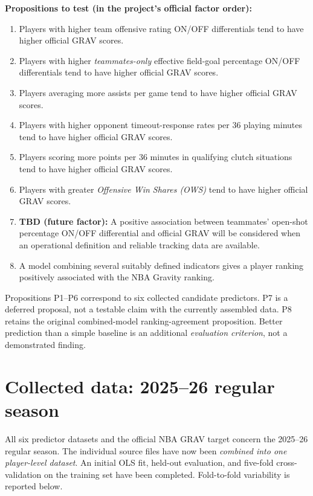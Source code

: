 \documentclass[11pt]{article}
\begin{document}
\textbf{Propositions to test (in the project's official factor order):}
\begin{enumerate}[label=\textbf{P\arabic*:}]
\item Players with higher team offensive rating ON/OFF differentials tend to
have higher official GRAV scores.
\item Players with higher \emph{teammates-only} effective field-goal percentage
ON/OFF differentials tend to have higher official GRAV scores.
\item Players averaging more assists per game tend to have higher official
GRAV scores.
\item Players with higher opponent timeout-response rates per 36 playing
minutes tend to have higher official GRAV scores.
\item Players scoring more points per 36 minutes in qualifying clutch
situations tend to have higher official GRAV scores.
\item Players with greater \emph{Offensive Win Shares (OWS)} tend to have
higher official GRAV scores.
\item \textbf{TBD (future factor):} A positive association between
teammates' open-shot percentage ON/OFF differential and official GRAV will be
considered when an operational definition and reliable tracking data are available.
\item A model combining several suitably defined indicators gives a player
ranking positively associated with the NBA Gravity ranking.
\end{enumerate}
Propositions P1--P6 correspond to six collected candidate predictors. P7
is a deferred proposal, not a testable claim with the currently assembled
data. P8 retains the original combined-model ranking-agreement proposition.
Better prediction than a simple baseline is an additional \emph{evaluation
criterion}, not a demonstrated finding.

\section{Collected data: 2025--26 regular season}
All six predictor datasets and the official NBA GRAV target concern the
2025--26 regular season. The individual source files have now been
\emph{combined into one player-level dataset}. An initial OLS fit,
held-out evaluation, and five-fold cross-validation on the training set
have been completed. Fold-to-fold variability is reported below.
\end{document}
